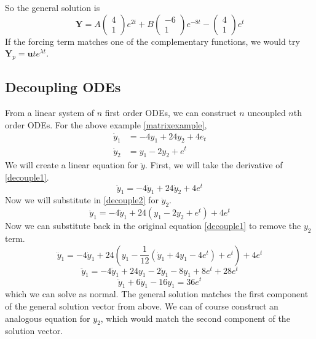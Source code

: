 \documentclass{article}
\begin{document}
So the general solution is
\[ \bm Y = A\begin{pmatrix}
		4 \\ 1
	\end{pmatrix}e^{2t} + B\begin{pmatrix}
		-6 \\ 1
	\end{pmatrix}e^{-8t} - \begin{pmatrix}
		4 \\ 1
	\end{pmatrix}e^t \]
If the forcing term matches one of the complementary functions, we would try $\bm Y_p = \bm u te^{\lambda t}$.

\subsection{Decoupling ODEs}
From a linear system of $n$ first order ODEs, we can construct $n$ uncoupled $n$th order ODEs. For the above example \eqref{matrixexample},
\begin{align}
	\label{decouple1} \dot y_1 & = -4y_1 + 24y_2 + 4e_t \\
	\label{decouple2} \dot y_2 & = y_1 - 2y_2 + e^t
\end{align}
We will create a linear equation for $\ddot y$. First, we will take the derivative of \eqref{decouple1}.
\[ \ddot y_1 = -4\dot y_1 + 24\dot y_2 + 4e^t \]
Now we will substitute in \eqref{decouple2} for $\dot y_2$.
\[ \ddot y_1 = -4\dot y_1 + 24(y_1 - 2y_2 + e^t) + 4e^t \]
Now we can substitute back in the original equation \eqref{decouple1} to remove the $y_2$ term.
\[ \ddot y_1 = -4\dot y_1 + 24\left(y_1 - \frac{1}{12}(\dot y_1 + 4y_1 - 4e^t) + e^t\right) + 4e^t \]
\[ \ddot y_1 = -4\dot y_1 + 24y_1 - 2\dot y_1 - 8y_1 + 8e^t + 28e^t \]
\[ \ddot y_1 + 6\dot y_1 - 16y_1 = 36e^t \]
which we can solve as normal. The general solution matches the first component of the general solution vector from above. We can of course construct an analogous equation for $y_2$, which would match the second component of the solution vector.
\end{document}
